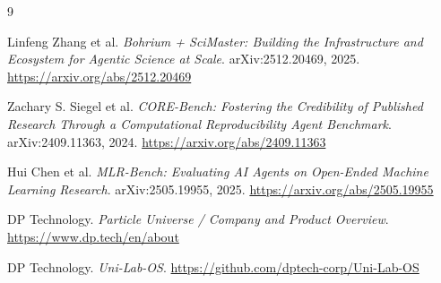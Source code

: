 \documentclass[11pt,fontset=fandol]{ctexart}
\begin{document}
\begin{thebibliography}{9}

Linfeng Zhang et al.
\textit{Bohrium + SciMaster: Building the Infrastructure and Ecosystem for Agentic Science at Scale}.
arXiv:2512.20469, 2025.
\url{https://arxiv.org/abs/2512.20469}

Zachary S. Siegel et al.
\textit{CORE-Bench: Fostering the Credibility of Published Research Through a Computational Reproducibility Agent Benchmark}.
arXiv:2409.11363, 2024.
\url{https://arxiv.org/abs/2409.11363}

Hui Chen et al.
\textit{MLR-Bench: Evaluating AI Agents on Open-Ended Machine Learning Research}.
arXiv:2505.19955, 2025.
\url{https://arxiv.org/abs/2505.19955}

DP Technology.
\textit{Particle Universe / Company and Product Overview}.
\url{https://www.dp.tech/en/about}

DP Technology.
\textit{Uni-Lab-OS}.
\url{https://github.com/dptech-corp/Uni-Lab-OS}

\end{thebibliography}
\end{document}
